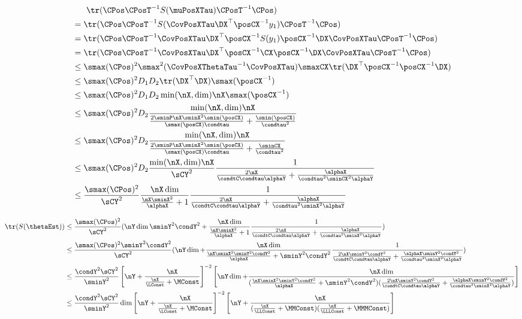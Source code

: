 \begin{align}
& \ \ \ \ \ \tr(\CPos \CPosT^{-1} S(\muPosXTau) \CPosT^{-1} \CPos) \\
&=\tr(\CPos \CPosT^{-1} S(\CovPosXTau \DX^\top \posCX^{-1} y_1) \CPosT^{-1} \CPos)\\
&=\tr(\CPos \CPosT^{-1} \CovPosXTau \DX^\top \posCX^{-1} S(y_1) \posCX^{-1} \DX \CovPosXTau \CPosT^{-1} \CPos)\\
&=\tr(\CPos \CPosT^{-1} \CovPosXTau \DX^\top \posCX^{-1} \CX \posCX^{-1} \DX \CovPosXTau \CPosT^{-1} \CPos) \\
& \le \smax(\CPos)^2 \smax^2(\CovPosXThetaTau^{-1} \CovPosXTau) \smaxCX \tr(\DX^\top \posCX^{-1} \posCX^{-1} \DX)\\
& \le \smax(\CPos)^2 D_1 D_2 \tr(\DX^\top \DX) \smax(\posCX^{-1})\\
& \le \smax(\CPos)^2 D_1 D_2 \min(\nX,\dim) \nX \smax(\posCX^{-1})\\
& \le \smax(\CPos)^2 D_2 \frac{\min(\nX,\dim) \nX}{\frac{2\sminP\nX \sminX^2 \smin(\posCX)}{\smax(\posCX)\condtau} + \frac{\smin(\posCX)}{\condtau^2}} \ \\
& \le \smax(\CPos)^2 D_2 \frac{\min(\nX,\dim) \nX}{\frac{2\sminP\nX \sminX^2 \smin(\posCX)}{\smax(\posCX)\condtau} + \frac{\sminCX}{\condtau^2}} \ \\
& \le \smax(\CPos)^2 D_2 \frac{\min(\nX,\dim) \nX}{\sCY^2} \frac{1}{\frac{2 \nX}{\condtC \condtau \alphaY} + \frac{\alphaX}{\condtau^2 \sminCX^2 \alphaY}} \ \\
& \le  \frac{\smax(\CPos)^2}{\sCY^2}  \frac{\nX \dim}{ \frac{\nX\sminX^2}{\alphaX} + 1}  \frac{1}{\frac{2 \nX}{\condtC \condtau \alphaY} + \frac{\alphaX}{\condtau^2 \sminX^2 \alphaY}}
\end{align}

\begin{align}
\tr(S(\thetaEst))
& \le \frac{\smax(\CPos)^2}{\sCY^2}
(\nY \dim \sminY^2 \condY^2  + 
\frac{\nX \dim}{ \frac{\nX\sminX^2}{\alphaX} + 1} \frac{1}{\frac{2 \nX}{\condtC \condtau \alphaY} + \frac{\alphaX}{\condtau^2 \sminX^2 \alphaY}})\\
& \le \frac{\smax(\CPos)^2 \sminY^2 \condY^2}{\sCY^2}
(\nY \dim + 
\frac{\nX \dim}{ \frac{\nX\sminX^2\sminY^2 \condY^2}{\alphaX} + \sminY^2 \condY^2} \frac{1}{\frac{2 \nX \sminY^2 \condY^2}{\condtC \condtau \alphaY} + \frac{\alphaX \sminY^2 \condY^2}{\condtau^2 \sminX^2 \alphaY}})\\
& \le \frac{\condY^2 \sCY^2}{\sminY^2} \left[ \nY + \frac{\nX}{\frac{\nX}{\LConst} + \MConst} \right]^{-2} 
\left[ \nY \dim + \frac{\nX \dim}{ 
(\frac{\nX\sminX^2\sminY^2 \condY^2}{\alphaX} + \sminY^2 \condY^2 ) 
(\frac{2 \nX \sminY^2 \condY^2}{\condtC \condtau \alphaY} + \frac{\alphaX \sminY^2 \condY^2}{\condtau^2 \sminX^2 \alphaY})} \right]\\
& \le \frac{\condY^2 \sCY^2}{\sminY^2} \dim \left[ \nY + \frac{\nX}{\frac{\nX}{\LConst} + \MConst} \right]^{-2} 
\left[ \nY + \frac{\nX}{ 
(\frac{\nX}{\LLConst} + \MMConst ) 
(\frac{\nX}{\LLLConst} + \MMMConst)} \right]
\end{align}

